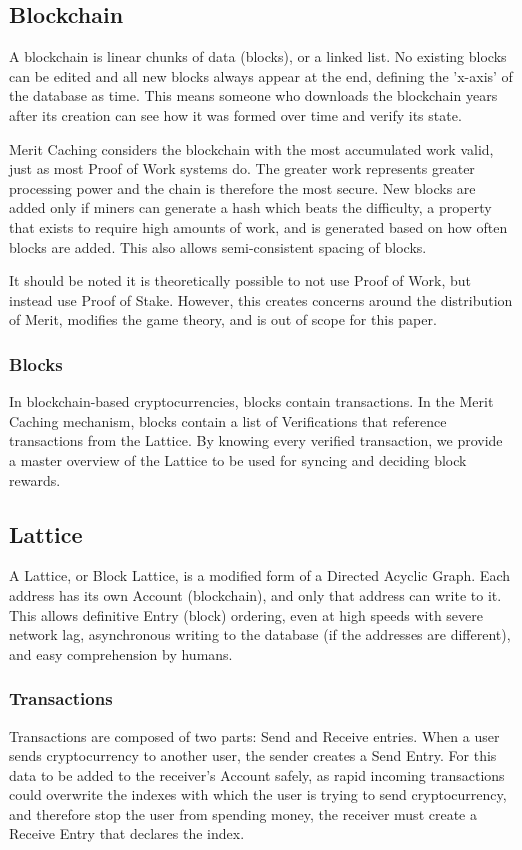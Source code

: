\documentclass[14pt]{article}
\begin{document}
\label{sec:1.1}
\subsection{Blockchain}
A blockchain is linear chunks of data (blocks), or a linked list. No existing blocks can be edited and all new blocks always appear at the end, defining the 'x-axis' of the database as time. This means someone who downloads the blockchain years after its creation can see how it was formed over time and verify its state. 

Merit Caching considers the blockchain with the most accumulated work valid, just as most Proof of Work systems do. The greater work represents greater processing power and the chain is therefore the most secure. New blocks are added only if miners can generate a hash which beats the difficulty, a property that exists to require high amounts of work, and is generated based on how often blocks are added. This also allows semi-consistent spacing of blocks.

It should be noted it is theoretically possible to not use Proof of Work, but instead use Proof of Stake. However, this creates concerns around the distribution of Merit, modifies the game theory, and is out of scope for this paper.

\label{sec:1.1.1}
\subsubsection{Blocks}
In blockchain-based cryptocurrencies, blocks contain transactions. In the Merit Caching mechanism, blocks contain a list of Verifications that reference transactions from the Lattice. By knowing every verified transaction, we provide a master overview of the Lattice to be used for syncing and deciding block rewards.

\label{sec:1.2}
\subsection{Lattice}
A Lattice, or Block Lattice, is a modified form of a Directed Acyclic Graph. Each address has its own Account (blockchain), and only that address can write to it. This allows definitive Entry (block) ordering, even at high speeds with severe network lag, asynchronous writing to the database (if the addresses are different), and easy comprehension by humans.

\label{sec:1.2.1}
\subsubsection{Transactions}
Transactions are composed of two parts: Send and Receive entries. When a user sends cryptocurrency to another user, the sender creates a Send Entry. For this data to be added to the receiver's Account safely, as rapid incoming transactions could overwrite the indexes with which the user is trying to send cryptocurrency, and therefore stop the user from spending money, the receiver must create a Receive Entry that declares the index.
\end{document}
